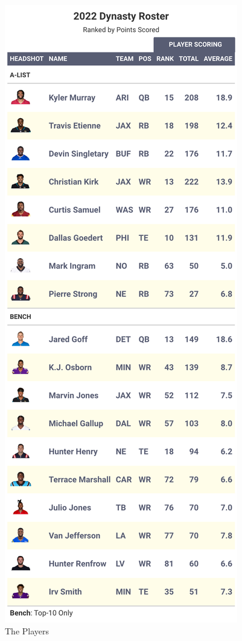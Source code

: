 \documentclass[
]{article}
\begin{document}
\begin{figure}
\includegraphics[width=0.75\linewidth,height=0.75\textheight]{output/2022/dynasty_roster_Cpmadden1} \caption{The Players}\label{fig:unnamed-chunk-27}
\end{figure}
\newpage
\end{document}
